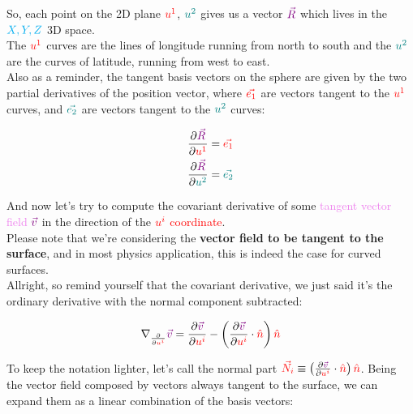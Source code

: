 So, each point on the 2D plane $\color{red}u^1$, $\color{teal}u^2$ gives us a vector $\color{violet}\vec{R}$ which lives in the $\color{cyan}X, Y, Z$ 3D space.\\
The $\color{red}u^1$ curves are the lines of longitude running from north to south and the $\color{teal}u^2$ are the curves of latitude, 
running from west to east.\\
Also as a reminder, the tangent basis vectors on the sphere are given by the two partial derivatives of the position vector, where $\color{red}\vec{e_1}$ are  
vectors tangent to the $\color{red}u^1$ curves, and $\color{teal}\vec{e_2}$ are vectors tangent to the $\color{teal}u^2$ curves:

\begin{align*}
    \frac{\partial \begingroup\color{violet}\vec{R}\endgroup}{\partial \begingroup\color{red}u^1\endgroup} &= \begingroup\color{red}\vec{e_1}\endgroup\\
    \frac{\partial \begingroup\color{violet}\vec{R}\endgroup}{\partial \begingroup\color{teal}u^2\endgroup} &= \begingroup\color{teal}\vec{e_2}\endgroup
\end{align*}

And now let's try to compute the covariant derivative of some \textcolor{violet}{tangent vector field} $\color{violet}\vec{v}$ in the direction of the $\color{red}u^i$ \textcolor{red}{coordinate}.\\
Please note that we're considering the \textbf{vector field to be tangent to the surface}, and in most physics application, this is indeed the case for curved surfaces.\\

Allright, so remind yourself that the covariant derivative, we just said it's the ordinary derivative with the normal component subtracted:

\begin{align*}
    \nabla_{\frac{\partial}{\partial \begingroup\color{red}u^i\endgroup}}\begingroup\color{violet}\vec{v}\endgroup = \frac{\partial \begingroup\color{violet}\vec{v}\endgroup}{\partial \begingroup\color{red}u^i\endgroup} - \left(\frac{\partial \begingroup\color{violet}\vec{v}\endgroup}{\partial \begingroup\color{red}u^i\endgroup} \cdot \begingroup\color{red}\hat{n}\endgroup\right)\begingroup\color{red}\hat{n}\endgroup
\end{align*}

To keep the notation lighter, let's call the normal part $\begingroup\color{red}\vec{N}_i\endgroup \equiv \left(\frac{\partial \begingroup\color{violet}\vec{v}\endgroup}{\partial \begingroup\color{red}u^i\endgroup} \cdot \begingroup\color{red}\hat{n}\endgroup\right)\begingroup\color{red}\hat{n}\endgroup$.
Being the vector field composed by vectors always tangent to the surface, we can expand them as a linear combination of the basis vectors:

